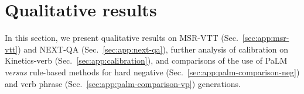 \begin{table}
    \setlength{\tabcolsep}{6pt}
    \centering
     \vspace{0.2cm}
    \caption{
    \textbf{Calibration strategy.} We report multi-choice accuracy on Verb$_H$~\cite{park-etal-2022-exposing} and Kinetics-400 top-1 accuracy. We observe that by combining both calibration steps, we avoid a drop in performance on Kinetics-400, while maintaining a large performance improvement on Verb$_H$. For experiments including hard negatives, we note that one hard negative is sampled for each video here.}
    \label{tab:calibration-steps}
\end{table}

\vspace{+1cm}
\section{Qualitative results}\label{sec:app:qualitative}

In this section, we present qualitative results on MSR-VTT (Sec.~\ref{sec:app:msr-vtt}) and NEXT-QA (Sec.~\ref{sec:app:next-qa}), further analysis of calibration on Kinetics-verb (Sec.~\ref{sec:app:calibration}), and comparisons of the use of PaLM \textit{versus} rule-based methods for hard negative (Sec.~\ref{sec:app:palm-comparison-neg}) and verb phrase (Sec.~\ref{sec:app:palm-comparison-vp}) generations.  

\vspace{+0.4cm}

